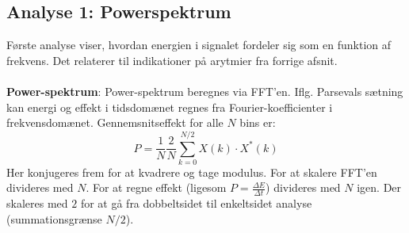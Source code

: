 \documentclass[a4paper]{report}
\begin{document}
\begin{par}

\subsection{Analyse 1: Powerspektrum}
Første analyse viser, hvordan energien i signalet fordeler sig som en funktion af frekvens.
Det relaterer til indikationer på arytmier fra forrige afsnit.
\\ \\
\textbf{Power-spektrum}: Power-spektrum beregnes via FFT'en.
Iflg. Parsevals sætning kan energi og effekt i tidsdomænet regnes fra Fourier-koefficienter i frekvensdomænet.
Gennemsnitseffekt for alle $N$ bins er:
$$ P = \frac{1}{N}\frac{2}{N}\sum_{k=0}^{N/2} X(k) \cdot X^*(k) $$
Her konjugeres frem for at kvadrere og tage modulus.
For at skalere FFT'en divideres med $N$.
For at regne effekt (ligesom $P=\frac{\Delta E}{\Delta t}$) divideres med $N$ igen.
Der skaleres med $2$ for at gå fra dobbeltsidet til enkeltsidet analyse (summationsgrænse $N/2$).

\end{par} 
\end{document}
